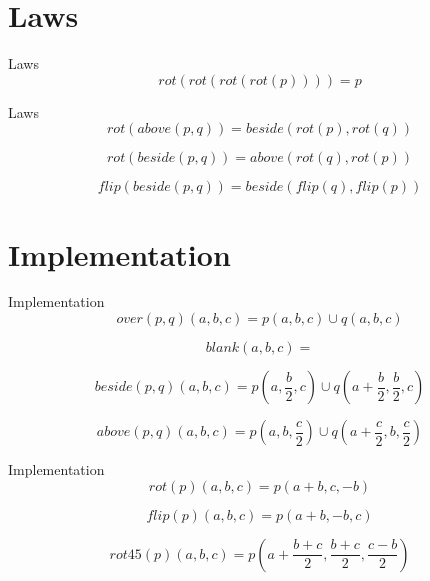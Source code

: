 \documentclass{beamer}
\begin{document}
	\section{Laws}
	
	\begin{frame}{Laws}
		\begin{equation*}
			rot(rot(rot(rot(p)))) = p
		\end{equation*}
	\end{frame}
		
	\begin{frame}{Laws}
		\begin{equation*}
			rot(above(p, q)) = beside(rot(p), rot(q))
		\end{equation*}

		\begin{equation*}
			rot(beside(p, q)) = above(rot(q), rot(p))
		\end{equation*}

		\begin{equation*}
			flip(beside(p, q)) = beside(flip(q), flip(p))
		\end{equation*}
	\end{frame}

	\section{Implementation}

	\begin{frame}{Implementation}
		\begin{equation*}
		over(p, q)(a, b, c) = p(a, b, c) \cup q(a, b, c)
		\end{equation*}

		\begin{equation*}
		blank(a, b, c) = \text{{}}
		\end{equation*}

		\begin{equation*}
		beside(p, q)(a, b, c) = p(a, \frac{b}{2}, c) \cup q(a + \frac{b}{2}, \frac{b}{2}, c)
		\end{equation*}

		\begin{equation*}
		above(p, q)(a, b, c) = p(a, b, \frac{c}{2}) \cup q (a + \frac{c}{2}, b, \frac{c}{2})
		\end{equation*}
	\end{frame}
		
	\begin{frame}{Implementation}
		\begin{equation*}
		rot(p)(a, b, c) = p(a + b, c, -b)
		\end{equation*}

		\begin{equation*}
		flip(p)(a, b, c) = p(a + b, -b, c)
		\end{equation*}
		
		\begin{equation*}
		rot45(p)(a, b, c) = p(a + \frac{b + c}{2}, \frac{b + c}{2}, \frac{c - b}{2})
		\end{equation*}
	\end{frame}
\end{document}
